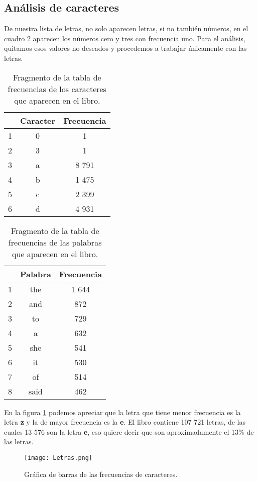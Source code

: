 \documentclass[12pt,letterpaper]{article}
\begin{document}
\subsection{Análisis de caracteres}
De nuestra lista de letras, no solo aparecen letras, si no también números, en el cuadro \ref{caracteres} aparecen los números cero y tres con frecuencia uno. Para el análisis, quitamos esos valores no deseados y procedemos a trabajar únicamente con las letras.
\begin{table}
\centering
\caption{Fragmento de la tabla de frecuencias de los caracteres que aparecen en el libro.}
\label{caracteres}
\begin{tabular}{ccc}
  \hline
 &Caracter & Frecuencia\\ 
  \hline
1& 0 &   1 \\ 
2&  3 &   1 \\ 
3& a & 8 791 \\ 
4& b & 1 475 \\ 
5& c & 2 399 \\ 
6& d & 4 931 \\ 
   \hline
\end{tabular}
\end{table}
\begin{table}
\centering
\caption{Fragmento de la tabla de frecuencias de las palabras que aparecen en el libro.}
\label{caracteres}
\begin{tabular}{ccc}
  \hline
 & Palabra & Frecuencia \\ 
  \hline
1 & the & 1 644 \\ 
  2 & and & 872 \\ 
  3 & to & 729 \\ 
  4 & a & 632 \\ 
  5 & she & 541 \\ 
  6 & it & 530 \\ 
  7 & of & 514 \\ 
  8 & said & 462 \\ 
   \hline
\end{tabular}
\end{table}

En la figura \ref{letras} podemos apreciar que la letra que tiene menor frecuencia es la letra \textbf{z} y la de mayor frecuencia es la \textbf{e}. El libro contiene 107 721 letras, de las cuales 13 576 son la letra \textbf{e}, eso quiere decir que son aproximadamente el 13\% de las letras.


\begin{figure}
\centering
\caption{Gráfica de barras de las frecuencias de caracteres.}
\label{letras}
\texttt{[image: Letras.png]}
\end{figure}
\end{document}
